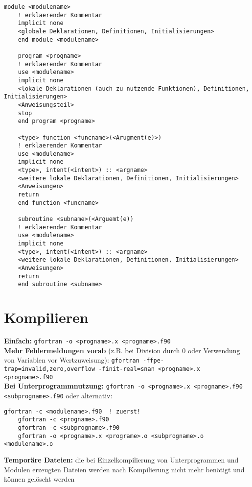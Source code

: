 \documentclass[a4paper, twocolumn]{scrarticle}
\begin{document}
  \begin{lstlisting}[caption={\bfseries Dateischema Modul, Haupt- und Unterprogramme }]
    module <modulename>
    ! erklaerender Kommentar
    implicit none
    <globale Deklarationen, Definitionen, Initialisierungen>
    end module <modulename>
    
    program <progname>
    ! erklaerender Kommentar
    use <modulename>
    implicit none
    <lokale Deklarationen (auch zu nutzende Funktionen), Definitionen, Initialisierungen>
    <Anweisungsteil>
    stop
    end program <progname>
    
    <type> function <funcname>(<Arugment(e)>)
    ! erklaerender Kommentar
    use <modulename>
    implicit none
    <type>, intent(<intent>) :: <argname>
    <weitere lokale Deklarationen, Definitionen, Initialisierungen>
    <Anweisungen>
    return
    end function <funcname>
    
    subroutine <subname>(<Arguemt(e))
    ! erklaerender Kommentar
    use <modulename>
    implicit none
    <type>, intent(<intent>) :: <argname>
    <weitere lokale Deklarationen, Definitionen, Initialisierungen>
    <Anweisungen>
    return
    end subroutine <subname>
  \end{lstlisting}
  \section{Kompilieren}
  \textbf{Einfach:} \lstinline[style=neutral]|gfortran -o <progname>.x <progname>.f90| \\
  \textbf{Mehr Fehlermeldungen vorab} (z.B. bei Division durch 0 oder Verwendung von Variablen vor Wertzuweisung): \lstinline[style=neutral]|gfortran -ffpe-trap=invalid,zero,overflow -finit-real=snan <progname>.x <progname>.f90|\\
  \textbf{Bei Unterprogrammnutzung:} \lstinline[style=neutral]|gfortran -o <progname>.x <progname>.f90 <subprogname>.f90| oder alternativ:
  \begin{lstlisting}[style=neutral,caption={\textbf{Kompilieren von Haupt- und Unterprogrammenn}}]
    gfortran -c <modulename>.f90  ! zuerst!
    gfortran -c <progname>.f90 
    gfortran -c <subprogname>.f90 
    gfortran -o <progname>.x <programe>.o <subprogname>.o <modulename>.o
  \end{lstlisting}
  \textbf{Temporäre Dateien:} die bei Einzelkompilierung von Unterprogrammen und Modulen erzeugten Dateien werden nach Kompilierung nicht mehr benötigt und können gelöscht werden
\end{document}
